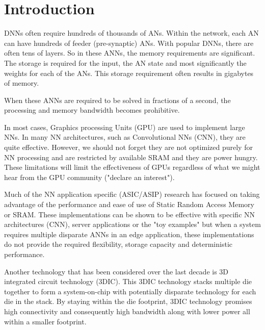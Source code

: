 \documentclass[journal]{IEEEtran}
\begin{document}
\section{Introduction}
% 
% 
% 
% 
 DNNs often require hundreds of thousands of ANs.
Within the network, each AN can have hundreds of feeder (pre-synaptic) ANs.
With popular DNNs, there are often tens of layers. 
So in these ANNs, the memory requirements are significant. The storage is required for the input, the AN state and most significantly the weights for each of the ANs. This storage requirement often results in gigabytes of memory.

When these ANNs are required to be solved in fractions of a second, the processing and memory bandwidth becomes prohibitive.

In most cases, Graphics processing Units (GPU) are used to implement large NNs. In many NN architectures, such as Convolutional NNs (CNN), they are quite effective. However, we should not forget they are not optimized purely for 
NN processing and are restricted by available SRAM and they are power hungry. These limitations will limit the effectiveness of GPUs regardless of what we might hear from the GPU community ("declare an interest").

Much of the NN application specific (ASIC/ASIP) research has focused on taking advantage of the performance and ease of use of Static Random Access Memory or SRAM. 
These implementations can be shown to be effective with specific NN architectures (CNN), server applications or the "toy examples" but when a system requires multiple disparate ANNs in an edge application, 
these implementations do not provide the required flexibility, storage capacity and deterministic performance.

Another technology that has been considered over the last decade is 3D integrated circuit technology (3DIC). 
This 3DIC technology stacks multiple die together to form a system-on-chip with potentially disparate technology for each die in the stack.
By staying within the die footprint, 3DIC technology promises high connectivity and consequently high bandwidth along with lower power all within a smaller footprint.
\end{document}
